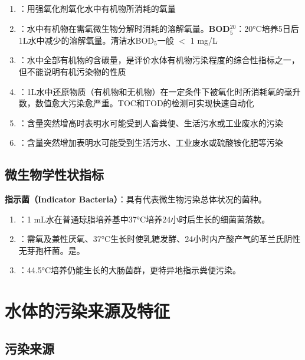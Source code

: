 \documentclass[10pt,a4paper,oneside]{ctexbook}
\begin{document}
\begin{keybox}
\begin{enumerate}[leftmargin=*]
    \item {}：用强氧化剂氧化水中有机物所消耗的氧量
    \item {}：水中有机物在需氧微生物分解时消耗的溶解氧量。\textbf{BOD$_5^{20}$}：20°C培养5日后1L水中减少的溶解氧量。清洁水BOD$_5$一般 $<$ 1 mg/L
    \item {}：水中全部有机物的含碳量，是评价水体有机物污染程度的综合性指标之一，但不能说明有机污染物的性质
    \item {}：1L水中还原物质（有机物和无机物）在一定条件下被氧化时所消耗氧的毫升数，数值愈大污染愈严重。TOC和TOD的检测可实现快速自动化
    \item {}：含量突然增高时表明水可能受到人畜粪便、生活污水或工业废水的污染
    \item {}：含量突然增加表明水可能受到生活污水、工业废水或硫酸铵化肥等污染
\end{enumerate}
\end{keybox}

\subsection{微生物学性状指标}

\begin{defbox}
\textbf{指示菌（Indicator Bacteria）}：具有代表微生物污染总体状况的菌种。
\end{defbox}

\begin{enumerate}[leftmargin=*]
    \item {}：1 mL水在普通琼脂培养基中37°C培养24小时后生长的细菌菌落数。
    \item {}：需氧及兼性厌氧、37°C生长时使乳糖发酵、24小时内产酸产气的革兰氏阴性无芽孢杆菌。是。
    \item {}：44.5°C培养仍能生长的大肠菌群，更特异地指示粪便污染。
\end{enumerate}

\section{水体的污染来源及特征}

\subsection{污染来源}
\end{document}
